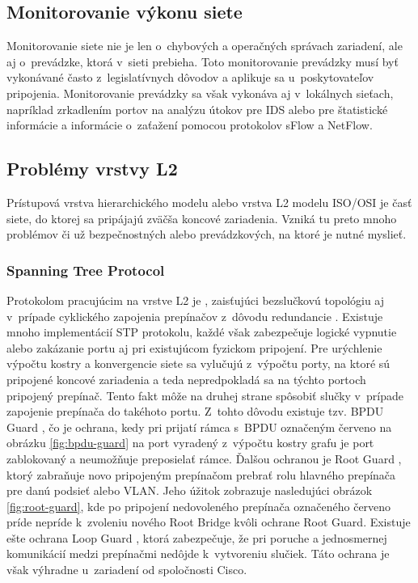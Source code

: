 \subsection*{Monitorovanie výkonu siete}
Monitorovanie siete nie je len o~chybových a operačných správach zariadení, ale aj o~prevádzke, ktorá v~sieti prebieha. Toto monitorovanie prevádzky musí byť vykonávané často z~legislatívnych dôvodov a aplikuje sa u~poskytovateľov pripojenia. Monitorovanie prevádzky sa však vykonáva aj v~lokálnych sieťach, napríklad zrkadlením portov \cite{Singh2018} na analýzu útokov pre IDS alebo pre štatistické informácie a informácie o~zaťažení pomocou protokolov sFlow a NetFlow.

\subsection*{Problémy vrstvy L2}
Prístupová vrstva hierarchického modelu alebo vrstva L2 modelu ISO/OSI je časť siete, do ktorej sa pripájajú zväčša koncové zariadenia. Vzniká tu preto mnoho problémov či už bezpečnostných alebo prevádzkových, na ktoré je nutné myslieť.

\subsubsection*{Spanning Tree Protocol}
Protokolom pracujúcim na vrstve L2 je , zaisťujúci bezslučkovú topológiu aj v~prípade cyklického zapojenia prepínačov z~dôvodu redundancie \cite{Lammle2013}. Existuje mnoho implementácií STP protokolu, každé však zabezpečuje logické vypnutie alebo zakázanie portu aj pri existujúcom fyzickom pripojení. Pre urýchlenie výpočtu kostry a konvergencie siete sa vylučujú z~výpočtu porty, na ktoré sú pripojené koncové zariadenia a teda nepredpokladá sa na týchto portoch pripojený prepínač. Tento fakt môže na druhej strane spôsobiť slučky v~prípade zapojenie prepínača do takéhoto portu. Z~tohto dôvodu existuje tzv. BPDU Guard \cite{Lammle2013}, čo je ochrana, kedy pri prijatí rámca s~BPDU označeným červeno na obrázku  \ref{fig:bpdu-guard} na port vyradený z~výpočtu kostry grafu je port zablokovaný a neumožňuje preposielať rámce. Ďalšou ochranou je Root Guard \cite{Vyncke2008}, ktorý zabraňuje novo pripojeným prepínačom prebrať rolu hlavného prepínača pre danú podsieť alebo VLAN. Jeho úžitok zobrazuje nasledujúci obrázok \ref{fig:root-guard}, kde po pripojení nedovoleného prepínača označeného červeno príde nepríde k~zvoleniu nového Root Bridge kvôli ochrane Root Guard. Existuje ešte ochrana Loop Guard \cite{Vyncke2008}, ktorá zabezpečuje, že pri poruche a jednosmernej komunikácií medzi prepínačmi nedôjde k~vytvoreniu slučiek. Táto ochrana je však výhradne u~zariadení od spoločnosti Cisco. 

